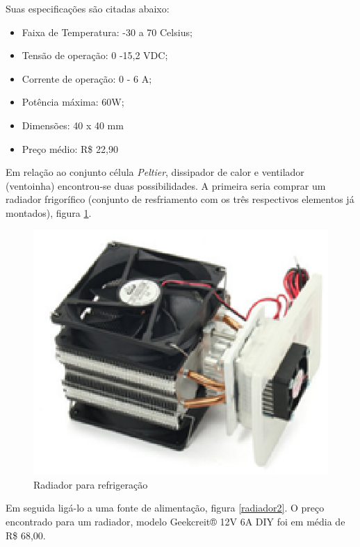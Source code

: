 Suas especificações são citadas abaixo:
\begin{itemize}
  \item Faixa de Temperatura: -30 a 70 Celsius;
  \item Tensão de operação: 0 -15,2 VDC;
  \item Corrente de operação: 0 - 6 A;
  \item Potência máxima: 60W;
  \item Dimensões: 40 x 40 mm
  \item Preço médio: R\$ 22,90
\end{itemize}

Em relação ao conjunto célula \textit{Peltier}, dissipador de calor e ventilador (ventoinha) encontrou-se duas possibilidades. A primeira seria comprar um radiador frigorífico (conjunto de resfriamento com os três respectivos elementos já montados), figura \ref{radiador}.

\begin{figure}[h]
	\centering
	\includegraphics[keepaspectratio=true,scale=0.5]{figuras/radiador.eps}
	\caption{Radiador para refrigeração}
	\label{radiador}
\end{figure}

Em seguida ligá-lo a uma fonte de alimentação, figura \ref{radiador2}. O preço encontrado para um radiador, modelo Geekcreit® 12V 6A DIY foi em média de R\$ 68,00.

